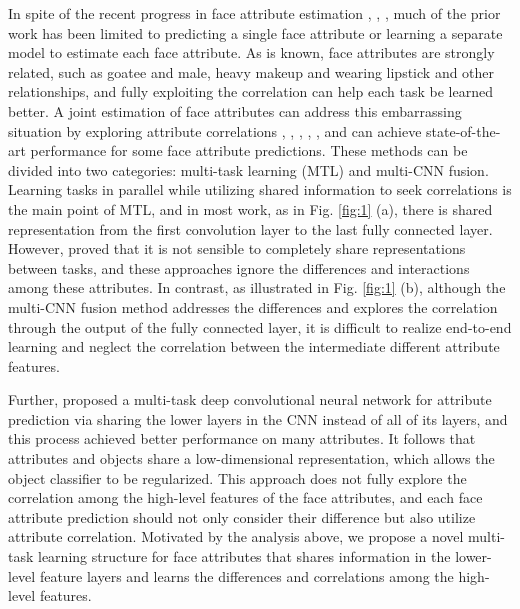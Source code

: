 \documentclass{sig-alternate-05-2015}
\begin{document}
In spite of the recent progress in face attribute estimation \cite{Kwon1994Age}, \cite{8082561}, \cite{Rothe2016Deep}, much of the prior work has been limited to predicting a single face attribute or learning a separate model to estimate each face attribute. As is known, face attributes are strongly related, such as goatee and male, heavy makeup and wearing lipstick and other relationships, and fully exploiting the correlation can help each task be learned better. A joint estimation of face attributes can address this embarrassing situation by exploring attribute correlations \cite{7410782}, \cite{7254184}, \cite{ehrlich2016facial}, \cite{8170321}, \cite{Han2017Heterogeneous}, and can achieve state-of-the-art performance for some face attribute predictions. These methods can be divided into two categories: multi-task learning (MTL) and multi-CNN fusion. Learning tasks in parallel while utilizing shared information to seek correlations is the main point of MTL, and in most work, as in Fig. \ref{fig:1} (a), there is shared representation from the first convolution layer to the last fully connected layer. However, \cite{misra2016cross} proved that it is not sensible to completely share representations between tasks, and these approaches ignore the differences and interactions among these attributes. In contrast, as illustrated in Fig. \ref{fig:1} (b), although the multi-CNN fusion method addresses the differences and explores the correlation through the output of the fully connected layer, it is difficult to realize end-to-end learning and neglect the correlation between the intermediate different attribute features.


Further, \cite{hand2017attributes} proposed a multi-task deep convolutional neural network for attribute prediction via sharing the lower layers in the CNN instead of all of its layers, and this process achieved better performance on many attributes. It follows that attributes and objects share a low-dimensional representation, which allows the object classifier to be regularized\cite{5995543}. This approach does not fully explore the correlation among the high-level features of the face attributes, and each face attribute prediction should not only consider their difference but also utilize attribute correlation. Motivated by the analysis above, we propose a novel multi-task learning structure for face attributes that shares information in the lower-level feature layers and learns the differences and correlations among the high-level features.
\end{document}
